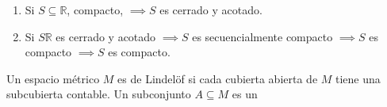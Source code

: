 \begin{remark}
\begin{enumerate}
    \item Si $S\subseteq \mathbb{R}$, compacto, $\implies S$ es cerrado y acotado. 
    \item Si $S\mathbb{R}$ es cerrado y acotado $\implies S$ es secuencialmente compacto $\implies  S$ es compacto $\implies S$ es compacto. 
\end{enumerate}
\end{remark}

\begin{remark}
Un espacio métrico $M$ es de Lindelöf si cada cubierta abierta de $M$ tiene una subcubierta contable. 
Un subconjunto $A\subseteq M$ es un  
\end{remark}

